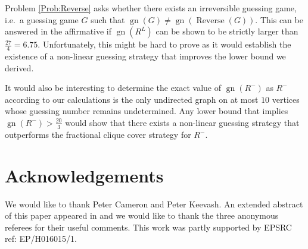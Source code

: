 \documentclass[a4paper, 14pt]{extarticle}
\theoremstyle{plain}
\newtheorem{conjecture}[proposition]{Conjecture}
\DeclareMathOperator{\gn}{gn}
\DeclareMathOperator{\Reverse}{Reverse}
\begin{document}


Problem \ref{Prob:Reverse} asks whether there exists an irreversible guessing game, i.e.\ a guessing game $G$ such that $\gn(G)\neq\gn(\Reverse(G))$. This can be answered in the affirmative if $\gn(R^L)$ can be shown to be strictly larger than $\frac{27}{4}=6.75$. Unfortunately, this might be hard to prove as it would establish the existence of a non-linear guessing strategy that improves the lower bound we derived. 

It would also be interesting to determine the exact value of $\gn(R^-)$ as $R^-$ according to our calculations is the only undirected graph on at most $10$ vertices whose guessing number remains undetermined. Any lower bound that implies $\gn(R^-) > \frac{20}{3}$ would show that there exists a non-linear guessing strategy that outperforms the fractional clique cover strategy for $R^-$.  

\section{Acknowledgements}
We would like to thank Peter Cameron and Peter Keevash. An extended abstract of this paper appeared in \cite{ConferencePaper} and we would like to thank the three anonymous referees for their useful comments. This work was partly supported by EPSRC ref: EP/H016015/1.
\end{document}
